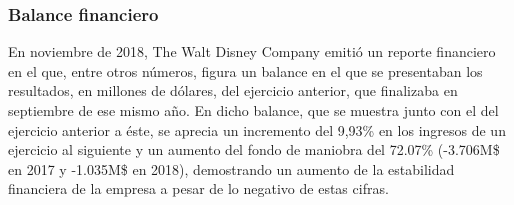 \subsubsection{Balance financiero}

En noviembre de 2018, The Walt Disney Company emitió un reporte financiero en el que, entre otros números, figura un balance en el que se presentaban los resultados, en millones de dólares, del ejercicio anterior, que finalizaba en septiembre de ese mismo año. En dicho balance, que se muestra junto con el del ejercicio anterior a éste, se aprecia un incremento del 9,93\% en los ingresos de un ejercicio al siguiente y un aumento del fondo de maniobra del 72.07\% (-3.706M\$ en 2017 y -1.035M\$ en 2018), demostrando un aumento de la estabilidad financiera de la empresa a pesar de lo negativo de estas cifras.